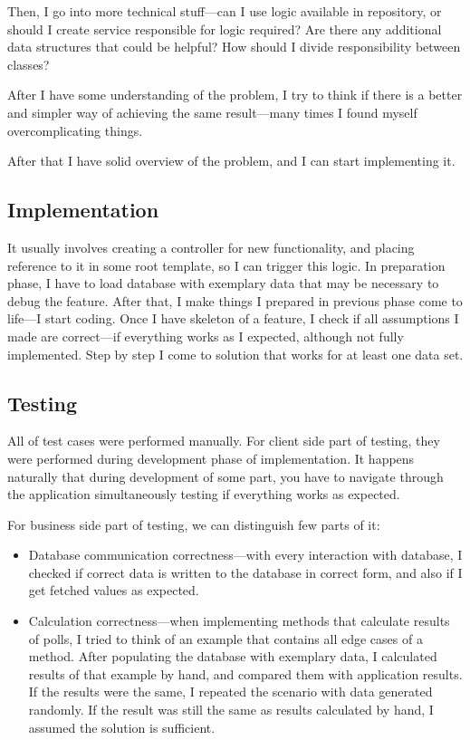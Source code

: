 \documentclass[a4paper,twoside,12pt]{book}
\begin{document}
        Then, I go into more technical stuff---can I use logic available in repository, or should I create service responsible for logic required?
        Are there any additional data structures that could be helpful?
        How should I divide responsibility between classes?

        After I have some understanding of the problem, I try to think if there is a better and simpler way of achieving the same result---many times I found myself overcomplicating things.

        After that I have solid overview of the problem, and I can start implementing it.

      \subsection{Implementation}
        It usually involves creating a controller for new functionality, and placing reference to it in some root template, so I can trigger this logic.
        In preparation phase, I have to load database with exemplary data that may be necessary to debug the feature.
        After that, I make things I prepared in previous phase come to life---I start coding.
        Once I have skeleton of a feature, I check if all assumptions I made are correct---if everything works as I expected, although not fully implemented.
        Step by step I come to solution that works for at least one data set.
        
      \subsection{Testing}
        All of test cases were performed manually.
        For client side part of testing, they were performed during development phase of implementation.
        It happens naturally that during development of some part, you have to navigate through the application simultaneously testing if everything works as expected.

        For business side part of testing, we can distinguish few parts of it:
        \begin{itemize}
          \item Database communication correctness---with every interaction with database, I checked if correct data is written to the database in correct form,
          and also if I get fetched values as expected.
          \item Calculation correctness---when implementing methods that calculate results of polls, I tried to think of an example that contains all edge cases of a method.
          After populating the database with exemplary data, I calculated results of that example by hand, and compared them with application results.
          If the results were the same, I repeated the scenario with data generated randomly. 
          If the result was still the same as results calculated by hand, I assumed the solution is sufficient.
        \end{itemize}
\end{document}
